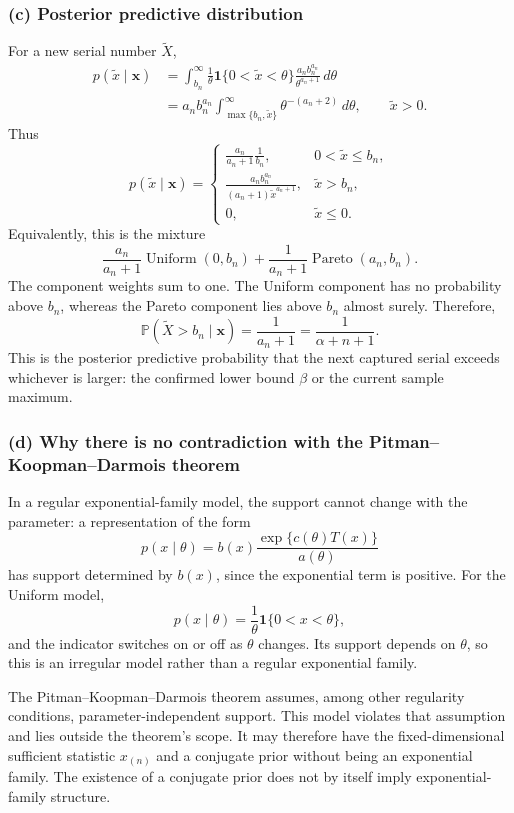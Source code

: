 \documentclass[11pt,a4paper]{article}
\newcommand{\xvec}{\boldsymbol{x}}
\begin{document}
\subsubsection*{(c) Posterior predictive distribution}

For a new serial number $\widetilde X$,
\begin{align*}
p(\widetilde x\mid\xvec)
&=\int_{b_n}^{\infty}
  \frac{1}{\theta}\mathbf{1}\{0<\widetilde x<\theta\}
  \frac{a_n b_n^{a_n}}{\theta^{a_n+1}}\,d\theta\\
&=a_n b_n^{a_n}
  \int_{\max\{b_n,\widetilde x\}}^{\infty}
  \theta^{-(a_n+2)}\,d\theta,
  \qquad \widetilde x>0.
\end{align*}
Thus
\[
p(\widetilde x\mid\xvec)
=
\begin{cases}
\displaystyle
\frac{a_n}{a_n+1}\frac{1}{b_n},
&0<\widetilde x\leq b_n,\\[1.1em]
\displaystyle
\frac{a_n b_n^{a_n}}{(a_n+1)\widetilde x^{a_n+1}},
&\widetilde x>b_n,\\[0.8em]
0,&\widetilde x\leq0.
\end{cases}
\]
Equivalently, this is the mixture
\[
\boxed{
\frac{a_n}{a_n+1}\operatorname{Uniform}(0,b_n)
+\frac{1}{a_n+1}\operatorname{Pareto}(a_n,b_n).
}
\]
The component weights sum to one. The Uniform component has no probability
above $b_n$, whereas the Pareto component lies above $b_n$ almost surely.
Therefore,
\[
\boxed{
\mathbb{P}(\widetilde X>b_n\mid\xvec)
=\frac{1}{a_n+1}
=\frac{1}{\alpha+n+1}.
}
\]
This is the posterior predictive probability that the next captured serial
exceeds whichever is larger: the confirmed lower bound $\beta$ or the current
sample maximum.

\subsubsection*{(d) Why there is no contradiction with the
Pitman--Koopman--Darmois theorem}

In a regular exponential-family model, the support cannot change with the
parameter: a representation of the form
\[
p(x\mid\theta)
=b(x)\frac{\exp\{c(\theta)T(x)\}}{a(\theta)}
\]
has support determined by $b(x)$, since the exponential term is positive.
For the Uniform model,
\[
p(x\mid\theta)=\frac{1}{\theta}
\mathbf{1}\{0<x<\theta\},
\]
and the indicator switches on or off as $\theta$ changes. Its support depends
on $\theta$, so this is an irregular model rather than a regular exponential
family.

The Pitman--Koopman--Darmois theorem assumes, among other regularity
conditions, parameter-independent support. This model violates that
assumption and lies outside the theorem's scope. It may therefore have the
fixed-dimensional sufficient statistic $x_{(n)}$ and a conjugate prior without
being an exponential family. The existence of a conjugate prior does not by
itself imply exponential-family structure.
\end{document}
